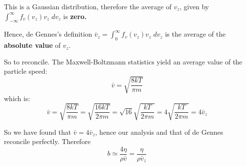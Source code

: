 \documentclass[a4paper]{report}
\begin{document}
This is a Gaussian distribution, therefore the average of $v_{z}$, given by
$ \int_{- \infty}^{\infty} f_{v}(v_{z}) v_{z} \; dv_{z}  $ is \textbf{zero.}

Hence, de Gennes's definition $\bar{v}_{z} = \int_{0}^{\infty} f_{v}(v_{z}) v_{z} \; dv_{z} $ is the average of the \textbf{absolute value} of $v_{z}$.

\vspace{1em}
So to reconcile.  The Maxwell-Boltzmann statistics yield an average value of the particle speed:
\begin{equation}
\bar{v} = \sqrt{\frac{8 k T}{\pi m}}
\end{equation}
which is:
\begin{equation}
\bar{v} = \sqrt{\frac{8 k T}{\pi m}} = \sqrt{\frac{16 k T}{2 \pi m}}
   = \sqrt{16} \sqrt{\frac{k T}{2 \pi m}} = 4 \sqrt{\frac{k T}{2 \pi m}}
   = 4 \bar{v}_{z}
\end{equation}
   
So we have found that $ \bar{v} = 4 \bar{v}_{z} $, hence our analysis and that of de Gennes reconcile perfectly.
Therefore
\begin{equation}
b \simeq \frac{4 \eta}{\rho \bar{v}} = \frac{\eta}{\rho \bar{v}_{z}}
\end{equation}
\end{document}
